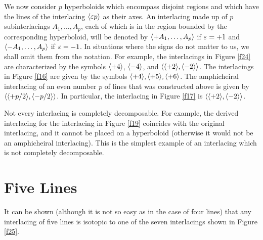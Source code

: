 \documentclass{article}
\begin{document}
We now consider $p$ hyperboloids which encompass disjoint regions and which
have the lines of the interlacing $\langle\varepsilon p\rangle$ as their axes. An
interlacing made up of $p$ subinterlacings $A_1,\dotsc,A_p$, each of which is
in the region bounded by the corresponding hyperboloid, will be denoted by 
$\langle+A_1,\dotsc,A_p\rangle$ if $\varepsilon=+1$ and $\langle-A_1,\dotsc,A_p\rangle$ if
$\varepsilon=-1$. In situations where the signs do not matter to us, we shall omit
them from the notation. For example, the interlacings in Figure 
\ref{f24} 
are characterized by the symbols $\langle+4\rangle$, $\langle-4\rangle$, and
$\langle\langle+2\rangle,\langle-2\rangle\rangle$. The interlacings in Figure \ref{f16} 
are given by the
symbols $\langle+4\rangle,\langle+5\rangle,\langle+6\rangle$. The amphicheiral interlacing of an even
number $p$ of lines that was constructed above is given by
$\langle\langle+p/2\rangle,\langle-p/2\rangle\rangle$. In particular, the interlacing in Figure
\ref{f17} is $\langle\langle+2\rangle,\langle-2\rangle\rangle$.

Not every interlacing is completely decomposable. For example, the derived
interlacing for the interlacing in Figure \ref{f19} coincides with the 
original
interlacing, and it cannot be placed on a hyperboloid (otherwise it would not
be an amphicheiral interlacing). This is the simplest example of an 
interlacing which is not completely decomposable.

\section{Five Lines}

It can be shown (although it is not so easy as in the case of four lines) that
any interlacing of five lines is isotopic to one of the seven interlacings
shown in Figure \ref{f25}. 
\end{document}
